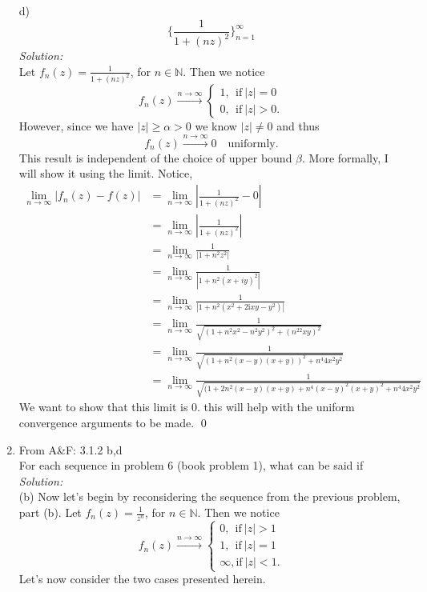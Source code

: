 \documentclass[10pt]{amsart}
\newcommand{\I}{\mathrm{i}}
\theoremstyle{nonumberplain}
\begin{document}
\begin{enumerate}[label={\bf {\arabic*}:}]
\newpage

\noindent
d) $$ \bigg\{ \frac 1 {1 + (nz)^2} \bigg\}_{n=1}^{\infty} $$
\textit{Solution:}\\
Let $f_n(z) = \frac 1 {1 + (nz)^2}$, for $n \in \mathbb N$. Then we notice
$$
f_n(z) \overset{n \to \infty}{\longrightarrow} \begin{cases}
1, \: \: \text{if}\: |z| = 0 \\
0, \: \: \text{if}\: |z| > 0.
\end{cases}
$$
However, since we have $|z| \geq \alpha > 0$ we know $|z| \neq 0$ and thus
$$
f_n(z) \overset{n \to \infty}{\longrightarrow} 0 \quad \text{uniformly}.
$$
This result is independent of the choice of upper bound $\beta$.
More formally, I will show it using the limit.
Notice,
\begin{align*}
\lim_{n \rightarrow \infty} \left| f_n(z) - f(z) \right|
	&= \lim_{n \rightarrow \infty} \left| \frac 1 {1 + (nz)^2} - 0 \right| \\
	&= \lim_{n \rightarrow \infty} \left| \frac 1 {1 + (nz)^2}\right| \\
	&= \lim_{n \rightarrow \infty} \frac 1 {|1 + n^2z^2|} \\
	&= \lim_{n \rightarrow \infty} \frac 1 {|1 + n^2(x + iy)^2|} \\
	&= \lim_{n \rightarrow \infty} \frac 1 {|1 + n^2(x^2 + 2\I x y - y^2) |} \\
	&= \lim_{n \rightarrow \infty} \frac 1 {\sqrt{(1 + n^2x^2 - n^2y^2)^2 + (n^22 x y)^2 }} \\
	&= \lim_{n \rightarrow \infty} \frac 1 {\sqrt{(1 + n^2(x - y)(x + y))^2 + n^4 4 x^2 y^2 }} \\
	&= \lim_{n \rightarrow \infty} \frac 1 {\sqrt{(1 + 2n^2(x - y)(x + y) + n^4(x - y)^2(x + y)^2 + n^4 4 x^2 y^2 }}
\end{align*}
We want to show that this limit is 0. this will help with the uniform convergence arguments to be made.
\qed
\newpage

\item From A\&F: 3.1.2 b,d \\
For each sequence in problem 6 (book problem 1), what can be said if \\
\textit{Solution:} \\
(b) Now let's begin by reconsidering the sequence from the previous problem, part (b).
Let $f_n(z) = \frac 1 {z^n}$, for $n \in \mathbb N$. Then we notice
$$
f_n(z) \overset{n \to \infty}{\longrightarrow} \begin{cases}
0, \: \: \text{if}\: |z| > 1 \\
1, \: \: \text{if}\: |z| = 1 \\
\infty, \text{if}\: |z| < 1.
\end{cases}
$$
Let's now consider the two cases presented herein. \\


\end{enumerate}
\end{document}

